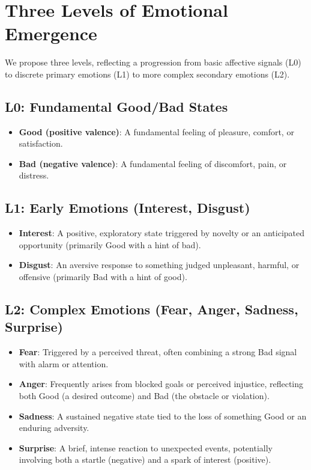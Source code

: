 \documentclass[11pt]{article}
\begin{document}
\section{Three Levels of Emotional Emergence}
\label{sec:hierarchy}
We propose three levels, reflecting a progression from basic affective signals (L0) to discrete primary emotions (L1) to more complex secondary emotions (L2).

\subsection{L0: Fundamental Good/Bad States}
\begin{itemize}
    \item \textbf{Good (positive valence)}: A fundamental feeling of pleasure, comfort, or satisfaction.  
    \item \textbf{Bad (negative valence)}: A fundamental feeling of discomfort, pain, or distress.
\end{itemize}

\subsection{L1: Early Emotions (Interest, Disgust)}
\begin{itemize}
    \item \textbf{Interest}: A positive, exploratory state triggered by novelty or an anticipated opportunity (primarily Good with a hint of bad).  
    \item \textbf{Disgust}: An aversive response to something judged unpleasant, harmful, or offensive (primarily Bad with a hint of good).
\end{itemize}

\subsection{L2: Complex Emotions (Fear, Anger, Sadness, Surprise)}
\begin{itemize}
    \item \textbf{Fear}: Triggered by a perceived threat, often combining a strong Bad signal with alarm or attention.  
    \item \textbf{Anger}: Frequently arises from blocked goals or perceived injustice, reflecting both Good (a desired outcome) and Bad (the obstacle or violation).  
    \item \textbf{Sadness}: A sustained negative state tied to the loss of something Good or an enduring adversity.  
    \item \textbf{Surprise}: A brief, intense reaction to unexpected events, potentially involving both a startle (negative) and a spark of interest (positive).
\end{itemize}
\end{document}
